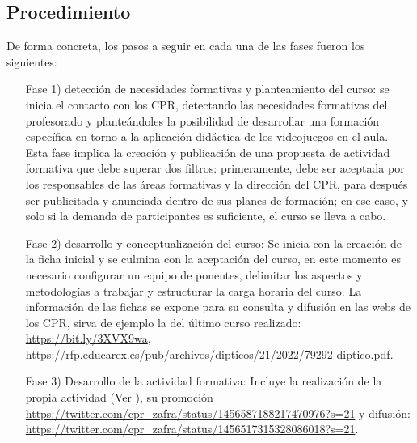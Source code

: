 \documentclass[spanish]{textolivre}
\begin{document}
\subsection{Procedimiento}\label{sec-organizacao-latex}
De forma concreta, los pasos a seguir en cada una de las fases fueron los siguientes:
\begin{enumerate}
    \item[Fase 1)] detección de necesidades formativas y planteamiento del curso: se inicia el contacto con los CPR, detectando las necesidades formativas del profesorado y planteándoles la posibilidad de desarrollar una formación específica en torno a la aplicación didáctica de los videojuegos en el aula. Esta fase implica la creación y publicación de una propuesta de actividad formativa que debe superar dos filtros: primeramente, debe ser aceptada por los responsables de las áreas formativas y la dirección del CPR, para después ser publicitada y anunciada dentro de sus planes de formación; en ese caso, y solo si la demanda de participantes es suficiente, el curso se lleva a cabo.
    \item[Fase 2)] desarrollo y conceptualización del curso: Se inicia con la creación de la ficha inicial y se culmina con la aceptación del curso, en este momento es necesario configurar un equipo de ponentes, delimitar los aspectos y metodologías a trabajar y estructurar la carga horaria del curso. La información de las fichas se expone para su consulta y difusión en las webs de los CPR, sirva de ejemplo la del último curso realizado: \url{https://bit.ly/3XVX9wa}, \url{https://rfp.educarex.es/pub/archivos/dipticos/21/2022/79292-diptico.pdf}.
    \item[Fase 3)] Desarrollo de la actividad formativa: Incluye la realización de la propia actividad (Ver ), su promoción \url{https://twitter.com/cpr_zafra/status/1456587188217470976?s=21} y difusión: \url{https://twitter.com/cpr_zafra/status/1456517315328086018?s=21}.


\end{enumerate}
\end{document}
